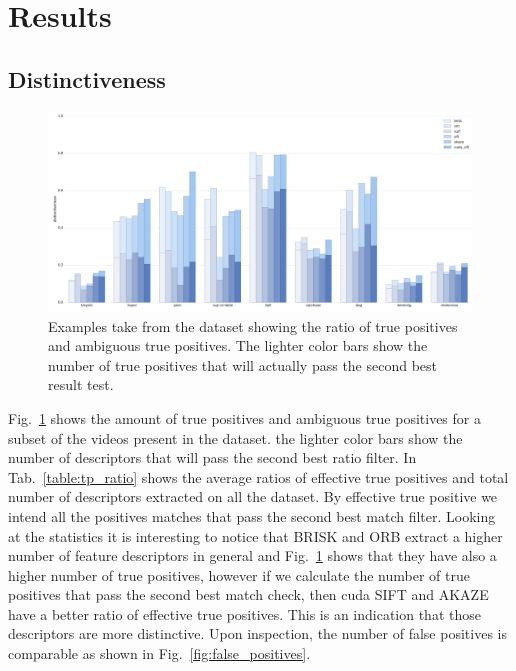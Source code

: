 \section{Results}

\subsection{Distinctiveness}

\begin{figure}[t]
\centerline{%
		\includegraphics[width=0.98\linewidth]{imgs/distinctivenessTP.pdf}}
    \vspace{-2mm} 
	\caption{Examples take from the dataset showing the ratio of true positives and ambiguous true positives. The lighter color bars show the number of true positives that will actually pass the second best result test.}
	\label{fig:distinctiveness}
\end{figure}

Fig.~\ref{fig:distinctiveness} shows the amount of true positives and ambiguous true positives for a subset of the videos present in the dataset. the lighter color bars show the number of descriptors that will pass the second best ratio filter. In Tab.~\ref{table:tp_ratio} shows the average ratios of effective true positives and total number of descriptors extracted on all the dataset. By effective true positive we intend all the positives matches that pass the second best match filter. Looking at the statistics it is interesting to notice that BRISK and ORB extract a higher number of feature descriptors in general and Fig.~\ref{fig:distinctiveness} shows that they have also a higher number of true positives, however if we calculate the number of true positives that pass the second best match check, then cuda SIFT and AKAZE have a better ratio of effective true positives. This is an indication that those descriptors are more distinctive. Upon inspection, the number of false positives is comparable as shown in Fig.~\ref{fig:false_positives}.

